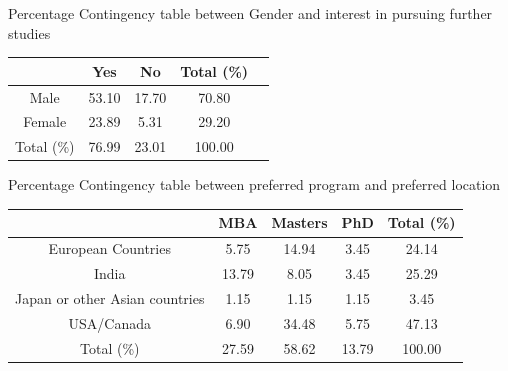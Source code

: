 \documentclass{beamer}
\begin{document}
\begin{frame}
  \begin{block}{ Percentage Contingency table between Gender and interest in pursuing further studies}
\begin{table}[h]
\centering
\begin{tabular}{|c|c|c|c|c|}
\hline
 & Yes & No  & Total (\%) \\
\hline
Male & 53.10 & 17.70 & 70.80  \\
\hline
Female & 23.89 & 5.31  & 29.20 \\
\hline
Total (\%)  & 76.99 & 23.01 & 100.00 \\

\hline
\end{tabular}

\end{table}

  \end{block}
\end{frame}
\begin{frame}
  \begin{block}{ Percentage Contingency table between preferred program and preferred location}
\begin{table}[h]
\centering
\begin{tabular}{|c|c|c|c|c|}
\hline
 & MBA & Masters & PhD & Total (\%) \\
\hline
European Countries & 5.75 & 14.94 & 3.45 & 24.14 \\
\hline
India & 13.79 & 8.05  & 3.45 & 25.29 \\
\hline
Japan or other Asian countries & 1.15 & 1.15 & 1.15 & 3.45  \\
\hline
USA/Canada & 6.90 & 34.48 & 5.75 & 47.13 \\
\hline
Total (\%)  & 27.59 & 58.62 & 13.79 & 100.00 \\

\hline
\end{tabular}

\end{table}

  \end{block}
\end{frame}
\end{document}
